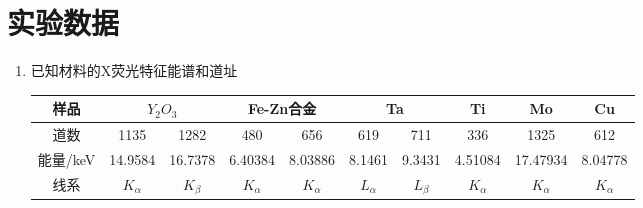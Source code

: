 \documentclass[a4paper]{article}
\begin{document}
\section{实验数据}
\begin{enumerate}
\item 已知材料的X荧光特征能谱和道址\\
\begin{table}[htbp]
	\begin{tabular}{|c|cc|cc|cc|c|c|c|}
	\hline
	样品      & \multicolumn{2}{c|}{$Y_{2}O_{3}$}              & \multicolumn{2}{c|}{Fe-Zn合金}             & \multicolumn{2}{c|}{Ta}              & Ti      & Mo       & Cu      \\ \hline
	道数      & \multicolumn{1}{c|}{1135}    & 1282    & \multicolumn{1}{c|}{480}     & 656     & \multicolumn{1}{c|}{619}    & 711    & 336     & 1325     & 612     \\ \hline
	能量/keV & \multicolumn{1}{c|}{14.9584} & 16.7378 & \multicolumn{1}{c|}{6.40384} & 8.03886 & \multicolumn{1}{c|}{8.1461} & 9.3431 & 4.51084 & 17.47934 & 8.04778 \\ \hline
	线系      & \multicolumn{1}{c|}{$K_\alpha$}      & {$K_\beta$}     & \multicolumn{1}{c|}{$K_\alpha$}    & {$K_\alpha$}      & \multicolumn{1}{c|}{$L_\alpha$}     & {$L_\beta$}      & {$K_\alpha$}      & {$K_\alpha$}       & {$K_\alpha$}      \\ \hline
\end{tabular}
\end{table}


\end{enumerate}
\end{document}
